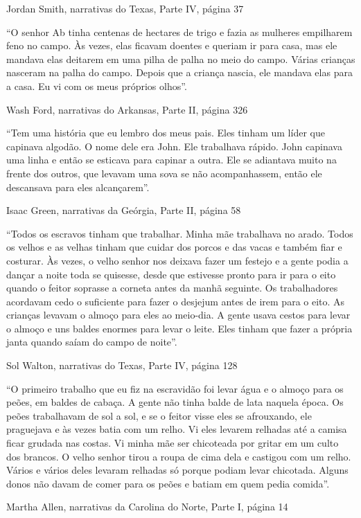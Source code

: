 Jordan Smith, narrativas do Texas, Parte IV, página 37

``O senhor Ab tinha centenas de hectares de trigo e fazia as mulheres
empilharem feno no campo. Às vezes, elas ficavam doentes e queriam ir
para casa, mas ele mandava elas deitarem em uma pilha de palha no meio
do campo. Várias crianças nasceram na palha do campo. Depois que a
criança nascia, ele mandava elas para a casa. Eu vi com os meus próprios
olhos''.

Wash Ford, narrativas do Arkansas, Parte II, página 326

``Tem uma história que eu lembro dos meus pais. Eles tinham um líder que
capinava algodão. O nome dele era John. Ele trabalhava rápido. John
capinava uma linha e então se esticava para capinar a outra. Ele se
adiantava muito na frente dos outros, que levavam uma sova se não
acompanhassem, então ele descansava para eles alcançarem''.

Isaac Green, narrativas da Geórgia, Parte II, página 58

``Todos os escravos tinham que trabalhar. Minha mãe trabalhava no arado.
Todos os velhos e as velhas tinham que cuidar dos porcos e das vacas e
também fiar e costurar. Às vezes, o velho senhor nos deixava fazer um
festejo e a gente podia a dançar a noite toda se quisesse, desde que
estivesse pronto para ir para o eito quando o feitor soprasse a corneta
antes da manhã seguinte. Os trabalhadores acordavam cedo o suficiente
para fazer o desjejum antes de irem para o eito. As crianças levavam o
almoço para eles ao meio-dia. A gente usava cestos para levar o almoço e
uns baldes enormes para levar o leite. Eles tinham que fazer a própria
janta quando saíam do campo de noite''.

Sol Walton, narrativas do Texas, Parte IV, página 128

``O primeiro trabalho que eu fiz na escravidão foi levar água e o almoço
para os peões, em baldes de cabaça. A gente não tinha balde de lata
naquela época. Os peões trabalhavam de sol a sol, e se o feitor visse
eles se afrouxando, ele praguejava e às vezes batia com um relho. Vi
eles levarem relhadas até a camisa ficar grudada nas costas. Vi minha
mãe ser chicoteada por gritar em um culto dos brancos. O velho senhor
tirou a roupa de cima dela e castigou com um relho. Vários e vários
deles levaram relhadas só porque podiam levar chicotada. Alguns donos
não davam de comer para os peões e batiam em quem pedia comida''.

Martha Allen, narrativas da Carolina do Norte, Parte I, página 14

